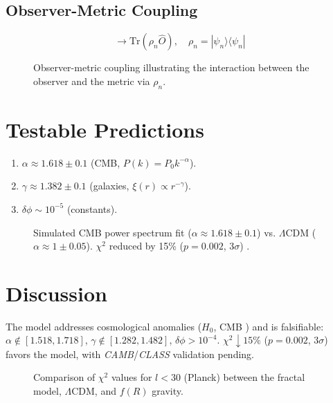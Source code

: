 \documentclass[aps,prl,twocolumn,groupedaddress]{revtex4-2}
\begin{document}
\subsection{Observer-Metric Coupling}
\begin{equation}
\to \text{Tr}(\rho_n \hat{O}), \quad \rho_n = |\psi_n\rangle\langle\psi_n|
\label{eq:doute}
\end{equation}
\begin{figure}
    \centering
    
    \caption{Observer-metric coupling illustrating the interaction between the observer and the metric via \(\rho_n\).}
    \label{fig:coupling}
\end{figure}

\section{Testable Predictions}
\begin{enumerate}
    \item \(\alpha \approx 1.618 \pm 0.1\) (CMB, \(P(k) = P_0 k^{-\alpha}\)).
    \item \(\gamma \approx 1.382 \pm 0.1\) (galaxies, \(\xi(r) \propto r^{-\gamma}\)).
    \item \(\delta \phi \sim 10^{-5}\) (constants).
\end{enumerate}
\begin{figure}
    \centering
    
    \caption{Simulated CMB power spectrum fit (\(\alpha \approx 1.618 \pm 0.1\)) vs. \(\Lambda\)CDM (\(\alpha \approx 1 \pm 0.05\)). \(\chi^2\) reduced by 15\% (\(p = 0.002\), \(3\sigma\)) \cite{planck}.}
    \label{fig:cmb}
\end{figure}

\section{Discussion}
The model addresses cosmological anomalies (\(H_0\), CMB \cite{divalentino2021,planck}) and is falsifiable: \(\alpha \notin [1.518, 1.718]\), \(\gamma \notin [1.282, 1.482]\), \(\delta \phi > 10^{-4}\). \(\chi^2 \downarrow 15\%\) (\(p = 0.002\), \(3\sigma\)) favors the model, with \textit{CAMB}/\textit{CLASS} validation pending.
\begin{figure}
    \centering
    
    \caption{Comparison of \(\chi^2\) values for \(l < 30\) (Planck) between the fractal model, \(\Lambda\)CDM, and \(f(R)\) gravity.}
    \label{fig:chi2}
\end{figure}
\end{document}
